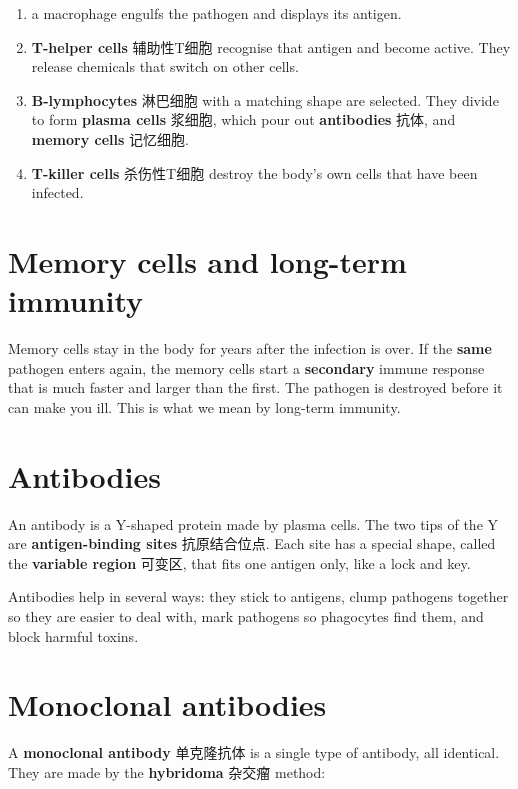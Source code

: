 \documentclass[11pt]{article}
\begin{document}
\begin{enumerate}
\item a macrophage engulfs the pathogen and displays its antigen.

\item \textbf{T-helper cells} 辅助性T细胞 recognise that antigen and become active. They release chemicals that switch on other cells.

\item \textbf{B-lymphocytes} 淋巴细胞 with a matching shape are selected. They divide to form \textbf{plasma cells} 浆细胞, which pour out \textbf{antibodies} 抗体, and \textbf{memory cells} 记忆细胞.

\item \textbf{T-killer cells} 杀伤性T细胞 destroy the body's own cells that have been infected.

\end{enumerate}

\section*{Memory cells and long-term immunity}

Memory cells stay in the body for years after the infection is over. If the \textbf{same} pathogen enters again, the memory cells start a \textbf{secondary} immune response that is much faster and larger than the first. The pathogen is destroyed before it can make you ill. This is what we mean by long-term immunity.

\section*{Antibodies}

An antibody is a Y-shaped protein made by plasma cells. The two tips of the Y are \textbf{antigen-binding sites} 抗原结合位点. Each site has a special shape, called the \textbf{variable region} 可变区, that fits one antigen only, like a lock and key.

Antibodies help in several ways: they stick to antigens, clump pathogens together so they are easier to deal with, mark pathogens so phagocytes find them, and block harmful toxins.

\section*{Monoclonal antibodies}

A \textbf{monoclonal antibody} 单克隆抗体 is a single type of antibody, all identical. They are made by the \textbf{hybridoma} 杂交瘤 method:
\end{document}
